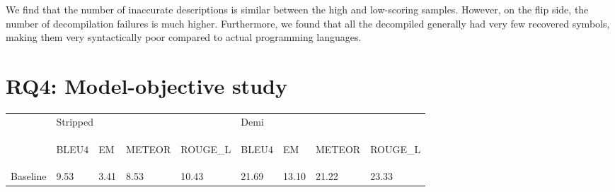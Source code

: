 We find that the number of inaccurate descriptions is similar between the high and low-scoring samples. However, on the flip side, the number of decompilation failures is much higher.
Furthermore, we found that all the decompiled generally had very few recovered symbols, making them very syntactically poor compared to actual programming languages.


\section{RQ4: Model-objective study}
\begin{table}[!h]
\centering
\begin{tabular}{l|llll|llll}
\rowcolor[rgb]{0.749,0.749,0.749} \multicolumn{1}{l}{} & \multicolumn{4}{l|}{Stripped}                                                                                                                        & Demi                               &                                  &                                      &                                       \\ 
\cline{2-9}
\begin{sideways}\textbf{}\end{sideways}                & \begin{sideways}BLEU4\end{sideways} & \begin{sideways}EM\end{sideways} & \begin{sideways}METEOR\end{sideways} & \begin{sideways}ROUGE\_L\end{sideways} & \begin{sideways}BLEU4\end{sideways} & \begin{sideways}EM\end{sideways} & \begin{sideways}METEOR\end{sideways} & \begin{sideways}ROUGE\_L\end{sideways}  \\ 
\hline
Baseline                                               & 9.53                                & 3.41                          & 8.53                                & 10.43                                   & 21.69                              & 13.10  & 21.22                                & 23.33                                                           \\

\end{tabular}
\end{table}

